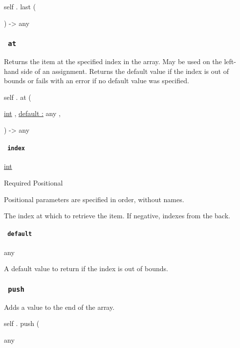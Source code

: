 self { . } { last } (

) -\textgreater{} { any }

\subsubsection{\texorpdfstring{\texttt{\ at\ }}{ at }}\label{definitions-at}

Returns the item at the specified index in the array. May be used on the
left-hand side of an assignment. Returns the default value if the index
is out of bounds or fails with an error if no default value was
specified.

self { . } { at } (

{ \href{/docs/reference/foundations/int/}{int} , } {
\hyperref[definitions-at-parameters-default]{default :} { any } , }

) -\textgreater{} { any }

\paragraph{\texorpdfstring{\texttt{\ index\ }}{ index }}\label{definitions-at-index}

\href{/docs/reference/foundations/int/}{int}

{Required} {{ Positional }}

\label{definitions-at-index-positional-tooltip}
Positional parameters are specified in order, without names.

The index at which to retrieve the item. If negative, indexes from the
back.

\paragraph{\texorpdfstring{\texttt{\ default\ }}{ default }}\label{definitions-at-default}

{ any }

A default value to return if the index is out of bounds.

\subsubsection{\texorpdfstring{\texttt{\ push\ }}{ push }}\label{definitions-push}

Adds a value to the end of the array.

self { . } { push } (

{ { any } }


